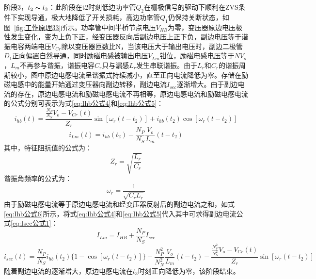                 

阶段3，$t_2 \thicksim t_3$：此阶段在t2时刻低边功率管$Q_2$在栅极信号的驱动下顺利在ZVS条件下实现导通，极大地降低了开关损耗，高边功率管$Q_1$仍保持关断状态，如图~\ref{fig:工作原理33}所示。功率管中间半桥节点电压$V_{HB}$为零，变压器原边电压极性发生变化，变为上负下正，经变压器反向后副边电压上正下负，副边电压等于谐振电容两端电压$V_{Cr}$除以变压器匝数比N，当该电压大于输出电压时，副边二极管$D_1$正向偏置自然导通，同时励磁电感被输出电压$V_{Lm}$钳位，励磁电感电压等于$NV_o$，$L_m$不再参与谐振，谐振电容$C_r$只与漏感$L_r$发生串联谐振。由于$L_r$和$C_r$的谐振周期较小，图中原边电感电流呈谐振式持续减小，直至正向电流降低为零。存储在励磁电感中的能量开始通过变压器向副边转移，副边电流$I_{sec}$逐渐增大。由于副边电流的存在，原边电感电流和励磁电感电流不再相等，原边电感电流和励磁电感电流的公式分别可表示为式\eqref{eq:Ihb公式4}和\eqref{eq:Ihb公式5}：
\begin{equation}
    \label{eq:Ihb公式4}
    i_{hb}(t) = \frac{\frac{N_P}{N_S}V_o - V_{Cr}(t)}{Z_r}\sin[\omega_r(t-t_2)] + i_{hb}(t_2) \cos[\omega_r(t-t_2)]  
\end{equation}
\begin{equation}
    \label{eq:Ihb公式5}
    i_{Lm}(t) = i_{hb}(t_2) - \frac{N_P}{N_S} \frac{V_o}{L_m}(t-t_2)
\end{equation}
其中，特征阻抗值的公式为：
\begin{equation}
    \label{eq:Zr公式}
    Z_r=\sqrt{\frac{L_r}{C_r}}  
\end{equation}
谐振角频率的公式为：
\begin{equation}
    \label{eq:omega_r公式}
    \omega_r=\frac{1}{\sqrt{C_r L_r}}
\end{equation}
由于励磁电感电流等于原边电感电流和经变压器反射后的副边电流之和，如式\eqref{eq:Ihb公式6}所示，将式\eqref{eq:Ihb公式4}和\eqref{eq:Ihb公式5}代入其中可求得副边电流公式\eqref{eq:Isec公式1}：
\begin{equation}
    \label{eq:Ihb公式6}
    I_{Lm} = I_{HB} + \frac{N_P}{N_S}I_{sec}
\end{equation}
\begin{equation}
    \label{eq:Isec公式1}
    i_{sec}(t) 
    = \frac{N_P}{N_S} i_{hb}(t_2) \{  1 - \cos[\omega_r(t-t_2)]\}  - \frac{N_P^2}{N_N^2} \frac{V_o}{L_m} (t-t_2)
    - \frac{\frac{N_P^2}{N_S^2} V_o - V_{Cr}(t)}{Z_r} \sin[\omega_r(t-t_2)]
\end{equation}
随着副边电流的逐渐增大，原边电感电流在$t_3$时刻正向降低为零，该阶段结束。



